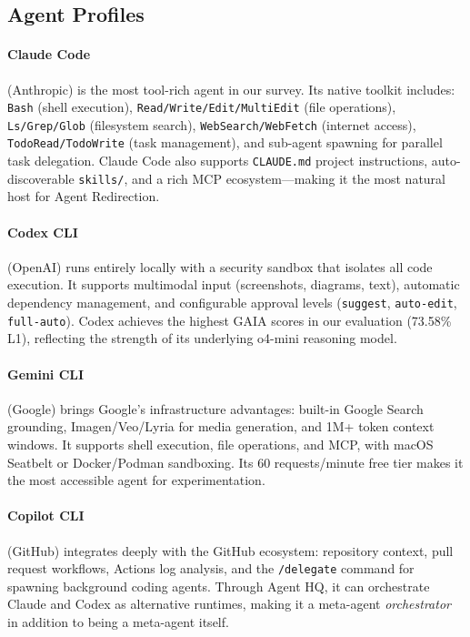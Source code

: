 \subsection{Agent Profiles}

\paragraph{Claude Code} (Anthropic) is the most tool-rich agent in our survey. Its native toolkit includes: \texttt{Bash} (shell execution), \texttt{Read/Write/Edit/MultiEdit} (file operations), \texttt{Ls/Grep/Glob} (filesystem search), \texttt{WebSearch/WebFetch} (internet access), \texttt{TodoRead/TodoWrite} (task management), and sub-agent spawning for parallel task delegation. Claude Code also supports \texttt{CLAUDE.md} project instructions, auto-discoverable \texttt{skills/}, and a rich MCP ecosystem---making it the most natural host for Agent Redirection.

\paragraph{Codex CLI} (OpenAI) runs entirely locally with a security sandbox that isolates all code execution. It supports multimodal input (screenshots, diagrams, text), automatic dependency management, and configurable approval levels (\texttt{suggest}, \texttt{auto-edit}, \texttt{full-auto}). Codex achieves the highest GAIA scores in our evaluation (73.58\% L1), reflecting the strength of its underlying o4-mini reasoning model.

\paragraph{Gemini CLI} (Google) brings Google's infrastructure advantages: built-in Google Search grounding, Imagen/Veo/Lyria for media generation, and 1M+ token context windows. It supports shell execution, file operations, and MCP, with macOS Seatbelt or Docker/Podman sandboxing. Its 60 requests/minute free tier makes it the most accessible agent for experimentation.

\paragraph{Copilot CLI} (GitHub) integrates deeply with the GitHub ecosystem: repository context, pull request workflows, Actions log analysis, and the \texttt{/delegate} command for spawning background coding agents. Through Agent HQ, it can orchestrate Claude and Codex as alternative runtimes, making it a meta-agent \textit{orchestrator} in addition to being a meta-agent itself.

